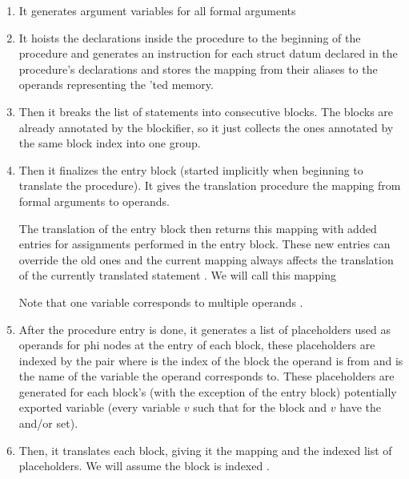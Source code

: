 \begin{enumerate}
    \item It generates argument variables for all formal arguments

    \item It hoists the declarations inside the procedure to the beginning of the procedure and generates an  instruction for each struct datum declared in the procedure's  declarations and stores the mapping from their aliases to the operands representing the 'ted memory.

    \item Then it breaks the list of statements into consecutive blocks. The blocks are already annotated by the blockifier, so it just collects the ones annotated by the same block index into one group.

    \item Then it finalizes the entry block (started implicitly when beginning to translate the procedure). It gives the translation procedure the mapping from formal arguments to operands.


    The translation of the entry block then returns this mapping with added entries for assignments performed in the entry block. These new entries can override the old ones and the current mapping always affects the translation of the currently translated statement . We will call this mapping 

    Note that one variable corresponds to multiple operands . 

    \item After the procedure entry is done, it generates a list  of placeholders used as operands for phi nodes at the entry of each block, these placeholders are indexed by the pair  where  is the index of the block the operand is from and  is the name of the variable the operand corresponds to. These placeholders are generated for each block's (with the exception of the entry block) potentially exported variable (every variable $v$ such that  for the block and $v$ have the  and/or  set).

    \item Then, it translates each block, giving it the  mapping and the indexed list of placeholders. We will assume the block is indexed .


\end{enumerate}
